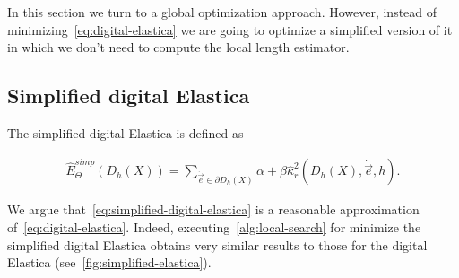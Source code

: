 In this section we turn to a global optimization approach. However, instead of minimizing~\cref{eq:digital-elastica} we are going to optimize a simplified version of it in which we don't need to compute the local length estimator.

\subsection{Simplified digital Elastica}
\label{ch6:subsec:simplified-digital-elastica}

The simplified digital Elastica is defined as

	\begin{align}
	\hat{E}_{\Theta}^{simp}( D_h(X) ) = \sum_{\dot{\vec{e}} \in \partial D_h(X)}{ \alpha + \beta \hat{\kappa}_{r}^2(D_h(X),\dot{\vec{e}},h) }.
	\label{eq:simplified-digital-elastica}
	\end{align}
	

We argue that~\cref{eq:simplified-digital-elastica} is a reasonable approximation of~\cref{eq:digital-elastica}. Indeed, executing~\cref{alg:local-search} for minimize the simplified digital Elastica obtains very similar results to those for the digital Elastica (see~\cref{fig:simplified-elastica}).


